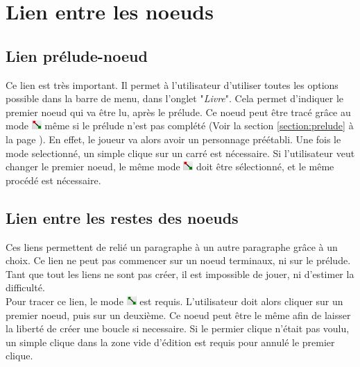\chapter{Lien entre les noeuds}\label{chapter:lien}

	\section{Lien prélude-noeud}
		Ce lien est très important. Il permet à l'utilisateur d'utiliser toutes les options possible dans la barre de menu, dans l'onglet "\textit{Livre}". Cela permet d'indiquer le premier noeud qui va être lu, après le prélude. Ce noeud peut être tracé grâce au mode \includegraphics[height=10pt]{img/modePreludeNoeud.png} même si le prélude n'est pas complété (Voir la section \ref{section:prelude} à la page \pageref{section:prelude}). En effet, le joueur va alors avoir un personnage préétabli.
		Une fois le mode selectionné, un simple clique sur un carré est nécessaire. Si l'utilisateur veut changer le premier noeud, le même mode \includegraphics[height=10pt]{img/modePreludeNoeud.png} doit être sélectionné, et le même procédé est nécessaire.

	\section{Lien entre les restes des noeuds}
		Ces liens permettent de relié un paragraphe à un autre paragraphe grâce à un choix. Ce lien ne peut pas commencer sur un noeud terminaux, ni sur le prélude. Tant que tout les liens ne sont pas créer, il est impossible de jouer, ni d'estimer la difficulté.\\

		Pour tracer ce lien, le mode \includegraphics[height=10pt]{img/modeLien.png} est requis. L'utilisateur doit alors cliquer sur un premier noeud, puis sur un deuxième. Ce noeud peut être le même afin de laisser la liberté de créer une boucle si necessaire.
		Si le permier clique n'était pas voulu, un simple clique dans la zone vide d'édition est requis pour annulé le premier clique.\\

